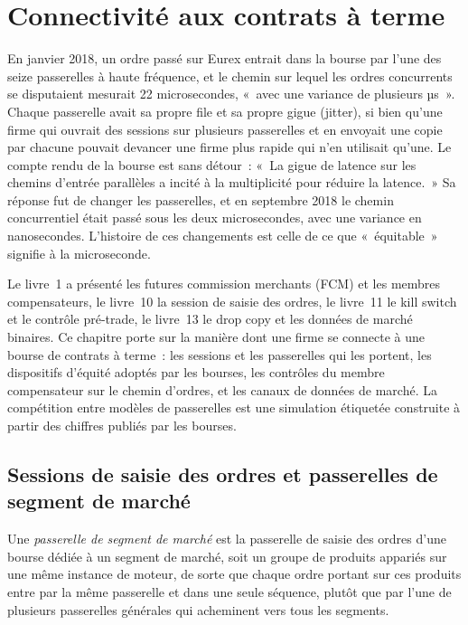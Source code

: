 \chapter{Connectivité aux contrats à terme}\label{ch:nw:futures-connectivity}

En janvier 2018, un ordre passé sur Eurex entrait dans la bourse par l'une des seize passerelles à haute fréquence, et le chemin
sur lequel les ordres concurrents se disputaient mesurait 22 microsecondes, «~avec une variance de plusieurs µs~». Chaque passerelle avait sa propre file et sa
propre gigue (jitter), si bien qu'une firme qui ouvrait des sessions sur plusieurs passerelles et en envoyait une copie par chacune pouvait devancer une firme plus rapide qui n'en utilisait qu'une. Le
compte rendu de la bourse est sans détour~: «~La gigue de latence sur les chemins d'entrée parallèles a incité à la multiplicité pour réduire la latence.~»
Sa réponse fut de changer les passerelles, et en septembre 2018 le chemin concurrentiel était passé sous les deux microsecondes, avec
une variance en nanosecondes. L'histoire de ces changements est celle de ce que «~équitable~» signifie à la microseconde.

Le livre~1 a présenté les futures commission merchants (FCM) et les membres compensateurs, le livre~10 la session de saisie des ordres, le livre~11 le kill switch
et le contrôle pré-trade, le livre~13 le drop copy et les données de marché binaires. Ce chapitre porte sur la manière dont une firme se connecte
à une bourse de contrats à terme~: les sessions et les passerelles qui les portent, les dispositifs d'équité adoptés par les bourses, les contrôles
du membre compensateur sur le chemin d'ordres, et les canaux de données de marché. La compétition entre modèles de passerelles est une simulation étiquetée
construite à partir des chiffres publiés par les bourses.

\section{Sessions de saisie des ordres et passerelles de segment de marché}

\begin{definition}\label{def:nw:futures-connectivity:msgw}
Une \emph{passerelle de segment de marché} est la passerelle de saisie des ordres d'une bourse dédiée à un
segment de marché, soit un groupe de produits appariés sur une même instance de moteur, de sorte que chaque ordre portant sur ces produits
entre par la même passerelle et dans une seule séquence, plutôt que par l'une de plusieurs passerelles générales qui acheminent vers tous les segments.
\end{definition}

